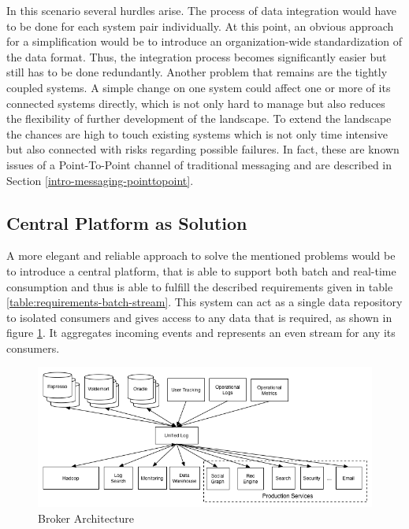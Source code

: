 In this scenario several hurdles arise. The process of data integration would
have to be done for each system pair individually. At this point, an obvious
approach for a simplification would be to introduce an organization-wide
standardization of the data format. Thus, the integration process becomes 
significantly easier but still has to be done redundantly. Another problem that
remains are the tightly coupled systems. A simple change on one system could
affect one or more of its connected systems directly, which is not only hard to
manage but also reduces the flexibility of further development of the landscape.
To extend the landscape the chances are high to touch existing systems which is
not only time intensive but also connected with risks regarding possible
failures. In fact, these are known issues of a Point-To-Point channel of
traditional messaging and are described in Section
\ref{intro-messaging-pointtopoint}.

\subsection{Central Platform as Solution}
\label{intro-datastream-centralplatform}
A more elegant and reliable approach to solve the mentioned problems would be to
introduce a central platform, that is able to support both batch and real-time
consumption and thus is able to fulfill the described requirements given in table
\ref{table:requirements-batch-stream}. This system can act as a single
data repository to isolated consumers and gives access to any data that is
required, as shown in figure \ref{fig:datapipeline_simple}. It aggregates
incoming events and represents an even stream for any its consumers. 

\begin{figure}[H]
    \centering
    \includegraphics[width=1.0\textwidth]{images/datapipeline_simple.png}
    \caption{Broker Architecture}
    \label{fig:datapipeline_simple}
\end{figure}

